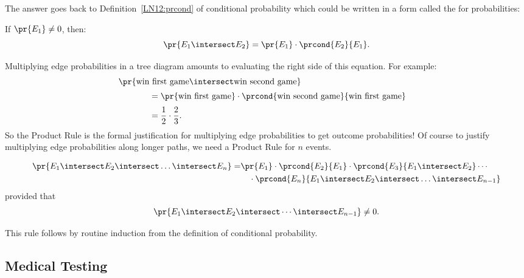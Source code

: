 The answer goes back to Definition~\ref{LN12:prcond} of conditional probability
which could be written in a form called the  for
probabilities:
%
\begin{rul*}
If $\pr{E_1} \neq 0$, then:
%
\[
    \pr{E_1 \intersect E_2} = \pr{E_1} \cdot \prcond{E_2}{E_1}.
\]
\end{rul*}
Multiplying edge probabilities in a tree diagram amounts to evaluating
the right side of this equation.  For example:
\begin{align*}
\lefteqn{\pr{\text{win first game} \intersect \text{win second game}}}
		\hspace{0.5in} \\[2pt]
	& = \pr{\text{win first game}} \cdot
            \prcond{\text{win second game}}{\text{win first game}} \\[2pt]
	& = \frac{1}{2} \cdot \frac{2}{3}.
\end{align*}
So the Product Rule is the formal justification for multiplying edge
probabilities to get outcome probabilities!  Of course to justify
multiplying edge probabilities along longer paths, we need a Product
Rule for $n$ events.

\begin{rul*}
\begin{align*}
\pr{E_1 \intersect E_2 \intersect \dots \intersect E_n}
   =& \pr{E_1}
        \cdot \prcond{E_2}{E_1}
        \cdot \prcond{E_3}{E_1 \intersect E_2}
        \cdots \\
    &\quad\cdot
        \prcond{E_n}{E_1 \intersect E_2 \intersect \dots
          \intersect E_{n - 1}}
\end{align*}
provided that %
\begin{equation*}
    \pr{E_1 \intersect E_2 \intersect \cdots \intersect E_{n - 1}}
    \neq 0.
\end{equation*}
\end{rul*}
This rule follows by routine induction from the definition of
conditional probability.

\subsection{Medical Testing}\label{med_test-subsection}


